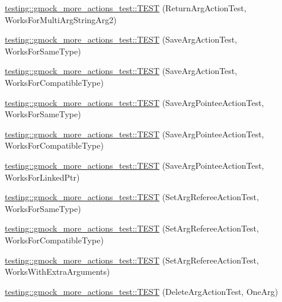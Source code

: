\begin{DoxyCompactItemize}
\item 
\mbox{\hyperlink{namespacetesting_1_1gmock__more__actions__test_ae280b3b95b0cdfcf7b81de95c8fe942d}{testing\+::gmock\+\_\+more\+\_\+actions\+\_\+test\+::\+T\+E\+ST}} (Return\+Arg\+Action\+Test, Works\+For\+Multi\+Arg\+String\+Arg2)
\item 
\mbox{\hyperlink{namespacetesting_1_1gmock__more__actions__test_a511b9c6721629465fd1e2fbd65633ef9}{testing\+::gmock\+\_\+more\+\_\+actions\+\_\+test\+::\+T\+E\+ST}} (Save\+Arg\+Action\+Test, Works\+For\+Same\+Type)
\item 
\mbox{\hyperlink{namespacetesting_1_1gmock__more__actions__test_a2b92b573de73fdf97dad4da8a67d7fc0}{testing\+::gmock\+\_\+more\+\_\+actions\+\_\+test\+::\+T\+E\+ST}} (Save\+Arg\+Action\+Test, Works\+For\+Compatible\+Type)
\item 
\mbox{\hyperlink{namespacetesting_1_1gmock__more__actions__test_a51d471708cb6fa3c403ea1d936a49dc1}{testing\+::gmock\+\_\+more\+\_\+actions\+\_\+test\+::\+T\+E\+ST}} (Save\+Arg\+Pointee\+Action\+Test, Works\+For\+Same\+Type)
\item 
\mbox{\hyperlink{namespacetesting_1_1gmock__more__actions__test_a35b74b32b6a222e048706e6ce8d64118}{testing\+::gmock\+\_\+more\+\_\+actions\+\_\+test\+::\+T\+E\+ST}} (Save\+Arg\+Pointee\+Action\+Test, Works\+For\+Compatible\+Type)
\item 
\mbox{\hyperlink{namespacetesting_1_1gmock__more__actions__test_afc168d80fe8ca16f0efc874587574e64}{testing\+::gmock\+\_\+more\+\_\+actions\+\_\+test\+::\+T\+E\+ST}} (Save\+Arg\+Pointee\+Action\+Test, Works\+For\+Linked\+Ptr)
\item 
\mbox{\hyperlink{namespacetesting_1_1gmock__more__actions__test_aa9fa575b30dca09e9886722b78415a22}{testing\+::gmock\+\_\+more\+\_\+actions\+\_\+test\+::\+T\+E\+ST}} (Set\+Arg\+Referee\+Action\+Test, Works\+For\+Same\+Type)
\item 
\mbox{\hyperlink{namespacetesting_1_1gmock__more__actions__test_af5a15dbcba14010a5463f3ac9451ab8a}{testing\+::gmock\+\_\+more\+\_\+actions\+\_\+test\+::\+T\+E\+ST}} (Set\+Arg\+Referee\+Action\+Test, Works\+For\+Compatible\+Type)
\item 
\mbox{\hyperlink{namespacetesting_1_1gmock__more__actions__test_a0ea4f3d8f1a643726e37825c58d8741f}{testing\+::gmock\+\_\+more\+\_\+actions\+\_\+test\+::\+T\+E\+ST}} (Set\+Arg\+Referee\+Action\+Test, Works\+With\+Extra\+Arguments)
\item 
\mbox{\hyperlink{namespacetesting_1_1gmock__more__actions__test_a575e9a6f5bfcc133188e973147697425}{testing\+::gmock\+\_\+more\+\_\+actions\+\_\+test\+::\+T\+E\+ST}} (Delete\+Arg\+Action\+Test, One\+Arg)

\end{DoxyCompactItemize}
